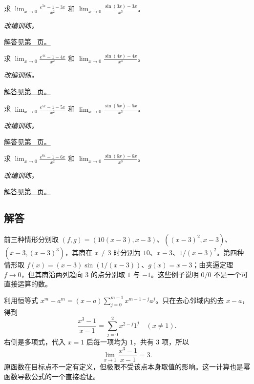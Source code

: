 \documentclass[12pt,fontset=fandol]{ctexart}
\begin{document}
\begin{example}[消去低阶项后的极限]\label{ex:c3q22}
求 $\displaystyle\lim_{x\to0}\frac{e^{3x}-1-3x}{x^2}$ 和 $\displaystyle\lim_{x\to0}\frac{\sin(3x)-3x}{x^3}$。
\par\textit{改编训练。}\par\hyperref[ans:c3q22]{解答见第~\pageref{ans:c3q22} 页。}
\end{example}
\begin{example}[消去低阶项后的极限]\label{ex:c3q23}
求 $\displaystyle\lim_{x\to0}\frac{e^{4x}-1-4x}{x^2}$ 和 $\displaystyle\lim_{x\to0}\frac{\sin(4x)-4x}{x^3}$。
\par\textit{改编训练。}\par\hyperref[ans:c3q23]{解答见第~\pageref{ans:c3q23} 页。}
\end{example}
\begin{example}[消去低阶项后的极限]\label{ex:c3q24}
求 $\displaystyle\lim_{x\to0}\frac{e^{5x}-1-5x}{x^2}$ 和 $\displaystyle\lim_{x\to0}\frac{\sin(5x)-5x}{x^3}$。
\par\textit{改编训练。}\par\hyperref[ans:c3q24]{解答见第~\pageref{ans:c3q24} 页。}
\end{example}
\begin{example}[消去低阶项后的极限]\label{ex:c3q25}
求 $\displaystyle\lim_{x\to0}\frac{e^{6x}-1-6x}{x^2}$ 和 $\displaystyle\lim_{x\to0}\frac{\sin(6x)-6x}{x^3}$。
\par\textit{改编训练。}\par\hyperref[ans:c3q25]{解答见第~\pageref{ans:c3q25} 页。}
\end{example}
\subsection{解答}
\begin{solve}\label{ans:c3q1}
前三种情形分别取 $(f,g)=(10(x-3),x-3)$、$((x-3)^2,x-3)$、$(x-3,(x-3)^3)$，其商在 $x\ne3$ 时分别为 $10$、$x-3$、$1/(x-3)^2$。第四种情形取 $f(x)=(x-3)\sin(1/(x-3))$、$g(x)=x-3$；由夹逼定理 $f\to0$，但其商沿两列趋向 $3$ 的点分别取 $1$ 与 $-1$。这些例子说明 $0/0$ 不是一个可直接运算的数。
\end{solve}

\begin{solve}\label{ans:c3q2}
利用恒等式 $x^m-a^m=(x-a)\sum_{j=0}^{m-1}x^{m-1-j}a^j$。只在去心邻域内约去 $x-a$，得到
\[
\frac{x^{3}-1}{x-1}=\sum_{j=0}^{2}x^{2-j}1^j\quad(x\ne 1).
\]
右侧是多项式，代入 $x=1$ 后每一项均为 $1$，共有 $3$ 项，所以
\[
\lim_{x\to 1}\frac{x^{3}-1}{x-1}=3.
\]
原函数在目标点不一定有定义，但极限不受该点本身取值的影响。这一计算也是幂函数导数公式的一个直接验证。
\end{solve}
\end{document}
